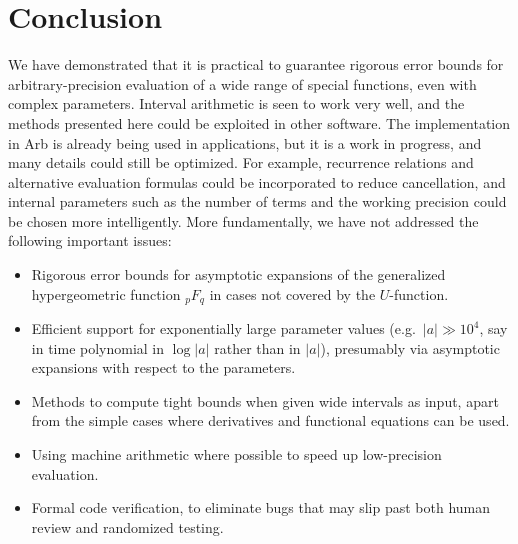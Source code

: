 \documentclass[review,nohypdvips]{siamart0216}
\begin{document}
\section{Conclusion}

We have demonstrated that it is practical
to guarantee rigorous error bounds for arbitrary-precision evaluation
of a wide range of special functions, even with complex parameters.
Interval arithmetic is seen to work very well, and the methods
presented here could be exploited in other software.
The implementation in Arb is already being used in applications,
but it is a work in progress, and many details could still be optimized.
For example, recurrence relations and alternative evaluation formulas
could be incorporated to reduce cancellation,
and internal parameters such as the number of terms
and the working precision could be chosen more intelligently.
More fundamentally, we have not addressed the following important issues:

\begin{itemize}
\item Rigorous error bounds for asymptotic expansions
of the generalized hypergeometric function ${}_pF_q$ in cases
not covered by the $U$-function.
\item Efficient support for exponentially large parameter values (e.g.\ $|a| \gg 10^4$, say
in time polynomial in $\log |a|$ rather than in $|a|$), presumably
via asymptotic expansions with respect to the parameters.
\item Methods to compute tight bounds when given wide intervals as input,
apart from the simple cases where derivatives and functional
equations can be used.
\item Using machine arithmetic where possible to speed up low-precision evaluation.
\item Formal code verification, to eliminate bugs that
may slip past both human review and randomized testing.
\end{itemize}




\end{document}
